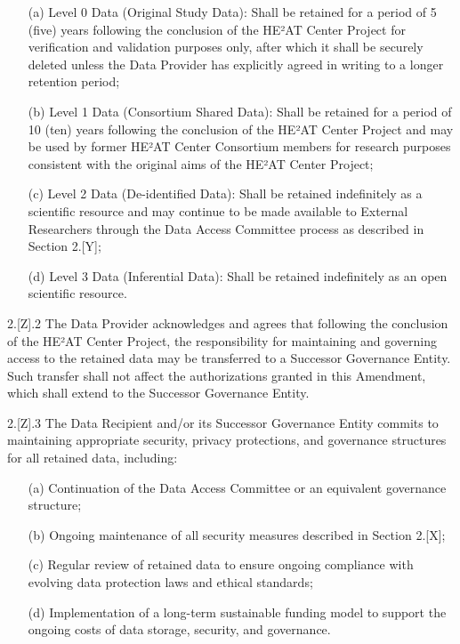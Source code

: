 \documentclass[12pt,letterpaper]{article}
\newcommand{\added}[1]{\textcolor{addcolor}{#1}}
\begin{document}
\added{\begin{enumerate}
\item[(a)] Level 0 Data (Original Study Data): Shall be retained for a period of 5 (five) years following the conclusion of the HE²AT Center Project for verification and validation purposes only, after which it shall be securely deleted unless the Data Provider has explicitly agreed in writing to a longer retention period;
   
\item[(b)] Level 1 Data (Consortium Shared Data): Shall be retained for a period of 10 (ten) years following the conclusion of the HE²AT Center Project and may be used by former HE²AT Center Consortium members for research purposes consistent with the original aims of the HE²AT Center Project;
   
\item[(c)] Level 2 Data (De-identified Data): Shall be retained indefinitely as a scientific resource and may continue to be made available to External Researchers through the Data Access Committee process as described in Section 2.[Y];
   
\item[(d)] Level 3 Data (Inferential Data): Shall be retained indefinitely as an open scientific resource.
\end{enumerate}}

\added{2.[Z].2 The Data Provider acknowledges and agrees that following the conclusion of the HE²AT Center Project, the responsibility for maintaining and governing access to the retained data may be transferred to a Successor Governance Entity. Such transfer shall not affect the authorizations granted in this Amendment, which shall extend to the Successor Governance Entity.}

\added{2.[Z].3 The Data Recipient and/or its Successor Governance Entity commits to maintaining appropriate security, privacy protections, and governance structures for all retained data, including:}

\added{\begin{enumerate}
\item[(a)] Continuation of the Data Access Committee or an equivalent governance structure;
   
\item[(b)] Ongoing maintenance of all security measures described in Section 2.[X];
   
\item[(c)] Regular review of retained data to ensure ongoing compliance with evolving data protection laws and ethical standards;
   
\item[(d)] Implementation of a long-term sustainable funding model to support the ongoing costs of data storage, security, and governance.
\end{enumerate}}
\end{document}
